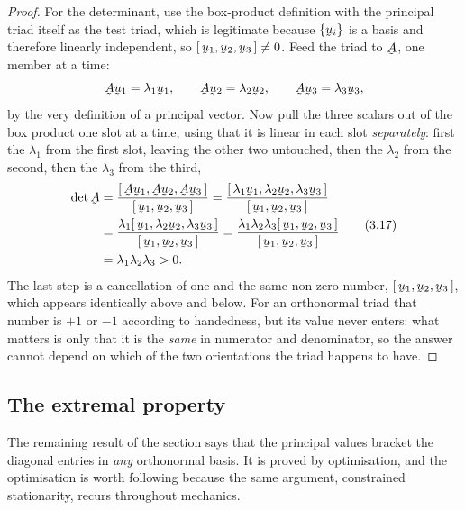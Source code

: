 \documentclass[17pt,a4paper]{extreport}
\DeclareRobustCommand{\vek}[1]{\underaccent{\tilde}{#1}}
\newcommand{\bu}{\vek{u}}
\newcommand{\bA}{\vek{A}}
\newcommand{\tbox}[3]{[\,#1,#2,#3\,]}
\theoremstyle{scplain}
\theoremstyle{scdefn}
\begin{document}
\begin{proof}
For the determinant, use the box-product definition with the principal
triad itself as the test triad, which is legitimate because $\{\bu_{i}\}$
is a basis and therefore linearly independent, so
$\tbox{\bu_{1}}{\bu_{2}}{\bu_{3}}\neq0$. Feed the triad to $\bA$, one
member at a time:
\[
   \bA\bu_{1}=\lambda_{1}\bu_{1},\qquad
   \bA\bu_{2}=\lambda_{2}\bu_{2},\qquad
   \bA\bu_{3}=\lambda_{3}\bu_{3},
\]
by the very definition of a principal vector. Now pull the three scalars
out of the box product one slot at a time, using that it is linear in each
slot \emph{separately}: first the $\lambda_{1}$ from the first slot,
leaving the other two untouched, then the $\lambda_{2}$ from the second,
then the $\lambda_{3}$ from the third,
\begin{equation}
\begin{aligned}
   \det\bA&=\frac{\tbox{\bA\bu_{1}}{\bA\bu_{2}}{\bA\bu_{3}}}
                 {\tbox{\bu_{1}}{\bu_{2}}{\bu_{3}}}
   =\frac{\tbox{\lambda_{1}\bu_{1}}{\lambda_{2}\bu_{2}}
               {\lambda_{3}\bu_{3}}}{\tbox{\bu_{1}}{\bu_{2}}{\bu_{3}}}\\
   &=\frac{\lambda_{1}\tbox{\bu_{1}}{\lambda_{2}\bu_{2}}
           {\lambda_{3}\bu_{3}}}{\tbox{\bu_{1}}{\bu_{2}}{\bu_{3}}}
   =\frac{\lambda_{1}\lambda_{2}\lambda_{3}
          \tbox{\bu_{1}}{\bu_{2}}{\bu_{3}}}
         {\tbox{\bu_{1}}{\bu_{2}}{\bu_{3}}}\\
   &=\lambda_{1}\lambda_{2}\lambda_{3}>0 .
\end{aligned}
   \tag{3.17}\label{eq:3.17}
\end{equation}
The last step is a cancellation of one and the same non-zero number,
$\tbox{\bu_{1}}{\bu_{2}}{\bu_{3}}$, which appears identically above and
below. For an orthonormal triad that number is $+1$ or $-1$ according to
handedness, but its value never enters: what matters is only that it is the
\emph{same} in numerator and denominator, so the answer cannot depend on
which of the two orientations the triad happens to have.
\end{proof}

\subsection*{The extremal property}

The remaining result of the section says that the principal values bracket
the diagonal entries in \emph{any} orthonormal basis. It is proved by
optimisation, and the optimisation is worth following because the same
argument, constrained stationarity, recurs throughout mechanics.
\end{document}
